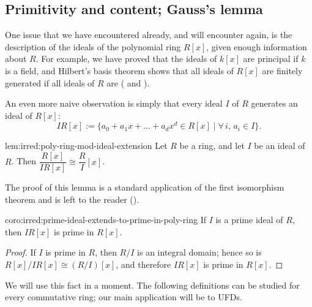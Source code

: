 \subsection{Primitivity and content; Gauss's lemma}
\label{subsec:irred:primitivity-and-content-gauss-s-lemma}
One issue that we have encountered already, and will encounter again,
is the description of the ideals of the polynomial ring $R[x]$, given
enough information about $R$. For example, we have proved that the
ideals of $k[x]$ are principal if $k$ is a field, and Hilbert's basis
theorem shows that all ideals of $R[x]$ are finitely generated if all
ideals of $R$ are ( and
).

An even more naive observation is simply that every ideal $I$ of $R$
generates an ideal of $R[x]$:
\[IR[x] := \{a_0 + a_1 x + \dots + a_d x^d \in R[x] \mid \forall\,
  i,\, a_i \in I\}.\]
\begin{lem}{}{lem:irred:poly-ring-mod-ideal-extension}
  Let $R$ be a ring, and let $I$ be an ideal of $R$. Then
  $\dfrac{R[x]}{IR[x]} \cong \dfrac{R}{I}[x]$.
\end{lem}

The proof of this lemma is a standard application of the first
isomorphism theorem and is left to the reader
().
\begin{coro}{}{coro:irred:prime-ideal-extends-to-prime-in-poly-ring}
  If $I$ is a prime ideal of $R$, then $IR[x]$ is prime in $R[x]$.
\end{coro}

\begin{proof}
  If $I$ is prime in $R$, then $R/I$ is an integral domain; hence so
  is $R[x]/IR[x] \cong (R/I)[x]$, and therefore $IR[x]$ is prime in
  $R[x]$.
\end{proof}

We will use this fact in a moment.  The following definitions can be
studied for every commutative ring; our main application will be to
UFDs.

